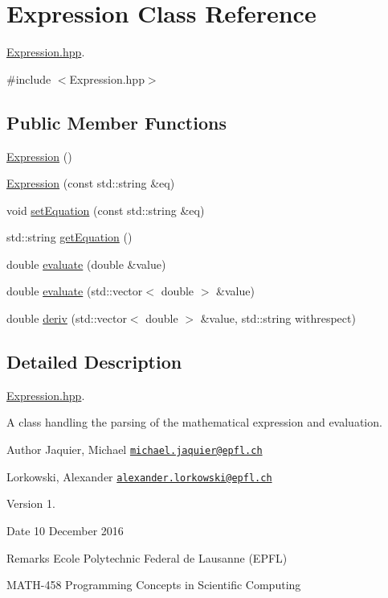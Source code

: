 \hypertarget{class_expression}{}\section{Expression Class Reference}
\label{class_expression}


\hyperlink{_expression_8hpp_source}{Expression.\+hpp}.  




{\ttfamily \#include $<$Expression.\+hpp$>$}

\subsection*{Public Member Functions}
\begin{DoxyCompactItemize}
\item 
\hyperlink{class_expression_afcf87716bf0abfe8d414c92529e1564a}{Expression} ()
\item 
\hyperlink{class_expression_ac05f006f37112e1f86b3de925d5e5aca}{Expression} (const std\+::string \&eq)
\item 
void \hyperlink{class_expression_acc1a1e38586e589a03cd1f1d9a3e38e0}{set\+Equation} (const std\+::string \&eq)
\item 
std\+::string \hyperlink{class_expression_a0c596f459d98b7825e436e3477069ec7}{get\+Equation} ()
\item 
double \hyperlink{class_expression_ad834721c6b104c69934b5ac180d08de0}{evaluate} (double \&value)
\item 
double \hyperlink{class_expression_a22213c980205c9ed34235bfec6c101a8}{evaluate} (std\+::vector$<$ double $>$ \&value)
\item 
double \hyperlink{class_expression_a7e3cec0588a3dee8a90621aed69ee009}{deriv} (std\+::vector$<$ double $>$ \&value, std\+::string withrespect)
\end{DoxyCompactItemize}


\subsection{Detailed Description}
\hyperlink{_expression_8hpp_source}{Expression.\+hpp}. 

A class handling the parsing of the mathematical expression and evaluation. \begin{DoxyAuthor}{Author}
Jaquier, Michael \href{mailto:michael.jaquier@epfl.ch}{\tt michael.\+jaquier@epfl.\+ch} 

Lorkowski, Alexander \href{mailto:alexander.lorkowski@epfl.ch}{\tt alexander.\+lorkowski@epfl.\+ch} 
\end{DoxyAuthor}
\begin{DoxyVersion}{Version}
1. 
\end{DoxyVersion}
\begin{DoxyDate}{Date}
10 December 2016 
\end{DoxyDate}
\begin{DoxyRemark}{Remarks}
Ecole Polytechnic Federal de Lausanne (E\+P\+FL) 

M\+A\+T\+H-\/458 Programming Concepts in Scientific Computing 
\end{DoxyRemark}


